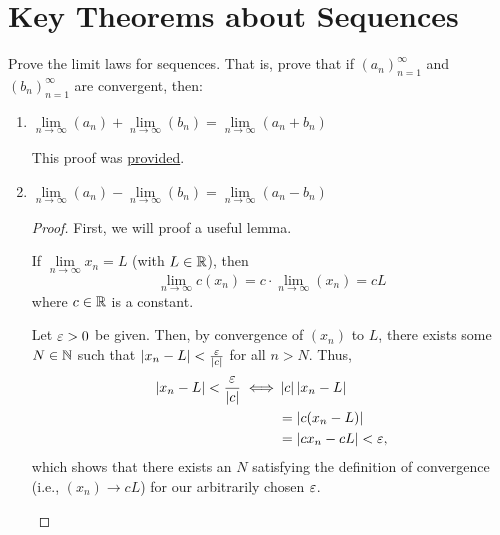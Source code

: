 \section{Key Theorems about Sequences}

\begin{problem}
  \label{prob:limit-laws}
  Prove the limit laws for sequences. That is, prove that if
  $(a_{n})_{n=1}^{\infty}$ and $(b_{n})_{n=1}^{\infty}$ are convergent, then:

    \begin{enumerate}[label=(\alph*)]
      \item $\lim\limits_{n \to \infty} {(a_{n})} + \lim\limits_{n \to \infty} {(b_{n})} = \lim\limits_{n \to \infty} {(a_{n} + b_{n})}$
        \label{prob:sum-limit-law}

        \begin{callout}
          This proof was \href{https://www.youtube.com/watch?v=Q7MzeAaL7bU&t=610s}{provided}.
        \end{callout}


      \item $\lim\limits_{n \to \infty} {(a_{n})} - \lim\limits_{n \to \infty} {(b_{n})} = \lim\limits_{n \to \infty} {(a_{n} - b_{n})}$
        \label{prob:subtraction-limit-law}

        \begin{proof}
          First, we will proof a useful lemma.

          \begin{lemma}
            \label{lem:constant-multiplication-limit-law}
            If $\lim\limits_{n \to \infty} x_{n} = L$ (with $L \in \mathbb{R}$), then 
            \[
              \lim\limits_{n \to \infty} c(x_{n}) = c \cdot \lim\limits_{n \to \infty} (x_{n}) = c L
            \]
            where $c \in \mathbb{R}$ is a constant.
          \end{lemma}

          \begin{subproof}
            Let $\varepsilon > 0$ be given. Then, by convergence of $(x_{n})$ to $L$, there exists
            some $N \in \mathbb{N}$ such that $\left\lvert x_{n} - L \right\rvert < \frac{\varepsilon}{\left\lvert c \right\rvert}$ for all $n > N$.
            Thus, 
            \begin{align*}
              \left\lvert x_{n} - L \right\rvert < \frac{\varepsilon}{\left\lvert c \right\rvert} \iff & \left\lvert c \right\rvert\left\lvert x_{n} - L \right\rvert \\
                                                          &= \left\lvert c(x_{n} - L) \right\rvert \\
                                                          &= \left\lvert cx_{n} - cL \right\rvert < \varepsilon,
            \end{align*}
            which shows that there exists an $N$ satisfying the definition of convergence (i.e., $(x_{n}) \to cL$) for our arbitrarily chosen $\varepsilon$.
          \end{subproof}


\end{proof}
\end{enumerate}
\end{problem}
